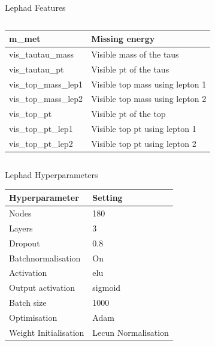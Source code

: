 \begin{frame}{Lephad Features}
\begin{columns}
\begin{column}{0.5\textwidth}
{\begin{tabular}{|l|l|}
                 m\_met                & Missing energy                \\ \hline
                 vis\_tautau\_mass     & Visible mass of the taus                  \\ \hline
                 vis\_tautau\_pt       & Visible pt of the taus                 \\ \hline
                 vis\_top\_mass\_lep1  & Visible top mass using lepton 1     \\ \hline
                 vis\_top\_mass\_lep2  & Visible top mass using lepton 2  \\ \hline
                 vis\_top\_pt          & Visible pt of the top                             \\ \hline
                 vis\_top\_pt\_lep1    & Visible top pt using lepton 1    \\ \hline
                 vis\_top\_pt\_lep2    & Visible top pt using lepton 2    \\ \hline
             \end{tabular}}
        \end{column}
    \end{columns}
\end{frame}

\begin{frame}{Lephad Hyperparameters}
    \begin{table}[]
    \begin{tabular}{|l|l|}
    \hline
    Hyperparameter          &     Setting              \\ \hline
    Nodes                   &     180                    \\ \hline
    Layers                  &     3                  \\ \hline
    Dropout                 &     0.8                  \\ \hline
    Batchnormalisation       &     On                   \\ \hline
    Activation              &     elu                  \\ \hline
    Output activation       &     sigmoid              \\ \hline
    Batch size              &     1000                 \\ \hline
    Optimisation            &     Adam                 \\ \hline
    Weight Initialisation   &     Lecun Normalisation  \\ \hline
    \end{tabular}
    \end{table}
\end{frame}
  
